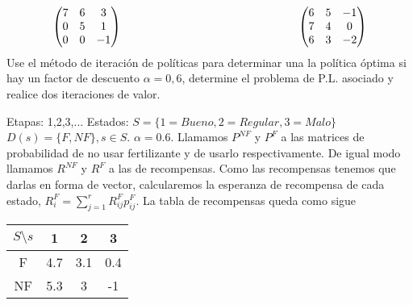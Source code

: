 \documentclass[twoside]{article}
\begin{document}
\begin{ejercicio}{2}
\[
\begin{pmatrix}
7 & 6 & 3\\
0 & 5 & 1\\
0 & 0 & -1
\end{pmatrix}\hskip5.5cm
\begin{pmatrix}
6 & 5 & -1\\
7 & 4 & 0\\
6 & 3 & -2
\end{pmatrix}
\]
Use el método de iteración de políticas para determinar una la política óptima si hay un factor de
descuento $\alpha = 0,6$, determine el problema de P.L. asociado y realice dos iteraciones de valor.
\begin{solucion}
Etapas: 1,2,3,...
Estados: $S=\{1=Bueno,2=Regular,3=Malo\}$
$D(s)=\{F,NF\}, s\in S$. $\alpha=0.6$. Llamamos $P^{NF}$ y $P^F$ a las matrices de probabilidad de no usar fertilizante y de usarlo respectivamente. De igual modo llamamos $R^{NF}$ y $R^F$ a las de recompensas. Como las recompensas tenemos que darlas en forma de vector, calcularemos la esperanza de recompensa de cada estado, $R^F_i=\sum_{j=1}^r R_{ij}^Fp^F_{ij}$. La tabla de recompensas queda como sigue
\begin{tabular}{c|ccc}
$S\setminus s$ & 1 & 2 & 3\\
\hline
F & 4.7 & 3.1 & 0.4\\
NF & 5.3 & 3 & -1
\end{tabular}


\end{solucion}
\end{ejercicio}
\end{document}
